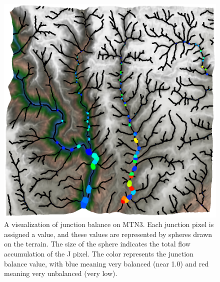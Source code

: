 \begin{figure}
\begin{minipage}[b]{0.9\linewidth}
\begin{center}
  \includegraphics[width=\linewidth]{images/JunctionPointBalanceVisualization_SansWatersheds_cropped.png}
\end{center}
\end{minipage}
\caption[A visualization of junction balance on MTN3]{\label{figure:JunctionBalance}A visualization of junction balance on MTN3. Each junction pixel is assigned a value, and these values are represented by spheres drawn on the terrain. The size of the sphere indicates the total flow accumulation of the J pixel. The color represents the junction balance value, with blue meaning very balanced (near 1.0) and red meaning very unbalanced (very low).
}
\end{figure}

% 


